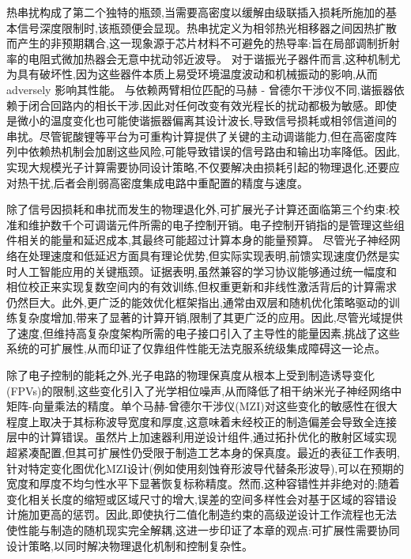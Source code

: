 \documentclass[11pt]{article}
\begin{document}
热串扰构成了第二个独特的瓶颈,当需要高密度以缓解由级联插入损耗所施加的基本信号深度限制时,该瓶颈便会显现。热串扰定义为相邻热光相移器之间因热扩散而产生的非预期耦合,这一现象源于芯片材料不可避免的热导率:旨在局部调制折射率的电阻式微加热器会无意中扰动邻近波导。\citep{doi_10_1109_access_2020_3013116_8fec1fb2} 对于谐振光子器件而言,这种机制尤为具有破坏性,因为这些器件本质上易受环境温度波动和机械振动的影响,从而 adversely 影响其性能。\citep{doi_10_3390_photonics13030300_610aff5a} \citep{doi_10_1117_12_3079802_9c364d8e} 与依赖两臂相位匹配的马赫 - 曾德尔干涉仪不同,谐振器依赖于闭合回路内的相长干涉,因此对任何改变有效光程长的扰动都极为敏感。即使是微小的温度变化也可能使谐振器偏离其设计波长,导致信号损耗或相邻信道间的串扰。尽管铌酸锂等平台为可重构计算提供了关键的主动调谐能力,但在高密度阵列中依赖热机制会加剧这些风险,可能导致错误的信号路由和输出功率降低。因此,实现大规模光子计算需要协同设计策略,不仅要解决由损耗引起的物理退化,还要应对热干扰,后者会削弱高密度集成电路中重配置的精度与速度。\citep{doi_10_1109_access_2020_3013116_8fec1fb2} \citep{doi_10_3390_nano14080697_c372a140} \citep{doi_10_1126_science_abj4396_40f36a09}

除了信号因损耗和串扰而发生的物理退化外,可扩展光子计算还面临第三个约束:校准和维护数千个可调谐元件所需的电子控制开销。电子控制开销指的是管理这些组件相关的能量和延迟成本,其最终可能超过计算本身的能量预算。\citep{doi_10_1364_oe_26_010914_a68558fb} \citep{doi_10_1109_jphot_2026_3695696_63cd0e68} 尽管光子神经网络在处理速度和低延迟方面具有理论优势,但实际实现表明,前馈实现速度仍然是实时人工智能应用的关键瓶颈。证据表明,虽然兼容的学习协议能够通过统一幅度和相位校正来实现复数空间内的有效训练,但权重更新和非线性激活背后的计算需求仍然巨大。此外,更广泛的能效优化框架指出,通常由双层和随机优化策略驱动的训练复杂度增加,带来了显著的计算开销,限制了其更广泛的应用。因此,尽管光域提供了速度,但维持高复杂度架构所需的电子接口引入了主导性的能量因素,挑战了这些系统的可扩展性,从而印证了仅靠组件性能无法克服系统级集成障碍这一论点。\citep{doi_10_55041_ijsrem43509_b9a7bd5e} \citep{s2_b765388f3cc18d6e5a0507522822def0e3503ec6_fa09b483}

除了电子控制的能耗之外,光子电路的物理保真度从根本上受到制造诱导变化(FPVs)的限制,这些变化引入了光学相位噪声,从而降低了相干纳米光子神经网络中矩阵-向量乘法的精度。单个马赫-曾德尔干涉仪(MZI)对这些变化的敏感性在很大程度上取决于其标称波导宽度和厚度,这意味着未经校正的制造偏差会导致全连接层中的计算错误。虽然片上加速器利用逆设计组件,通过拓扑优化的散射区域实现超紧凑配置,但其可扩展性仍受限于制造工艺本身的保真度。最近的表征工作表明,针对特定变化图优化MZI设计(例如使用刻蚀脊形波导代替条形波导),可以在预期的宽度和厚度不均匀性水平下显著恢复标称精度。然而,这种容错性并非绝对的;随着变化相关长度的缩短或区域尺寸的增大,误差的空间多样性会对基于区域的容错设计施加更高的惩罚。因此,即使执行二值化制造约束的高级逆设计工作流程也无法使性能与制造的随机现实完全解耦,这进一步印证了本章的观点:可扩展性需要协同设计策略,以同时解决物理退化机制和控制复杂性。\citep{doi_10_1109_tnano_2022_3223915_d4da3e6b} \citep{doi_10_1038_s41467_026_68648_1_26658a9c}
\end{document}
